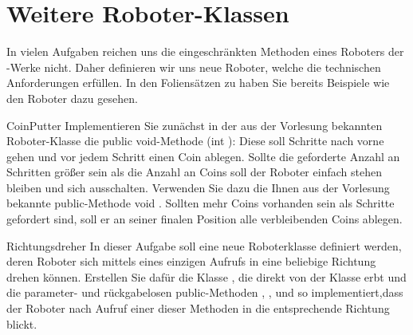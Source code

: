 \documentclass{../preamble}
\begin{document}
\clearpage

\section*{Weitere Roboter-Klassen}
In vielen Aufgaben reichen uns die eingeschränkten Methoden eines Roboters der -Werke nicht. Daher definieren wir uns neue Roboter, welche die technischen Anforderungen erfüllen. In den Foliensätzen zu  haben Sie bereits Beispiele wie den  Roboter dazu gesehen.


\begin{task}[credit = \stars{1}{3}]{CoinPutter}
    Implementieren Sie zunächst in der aus der Vorlesung bekannten Roboter-Klasse  die \textcolor{keywordcolor}{public} \textcolor{keywordcolor}{void}-Methode (\textcolor{keywordcolor}{int} ): Diese soll  Schritte nach vorne gehen und vor jedem Schritt einen Coin ablegen. Sollte die geforderte Anzahl an Schritten größer sein als die Anzahl an Coins soll der Roboter einfach stehen bleiben und sich ausschalten. Verwenden Sie dazu die Ihnen aus der Vorlesung bekannte \textcolor{keywordcolor}{public}-Methode \textcolor{keywordcolor}{void} . Sollten mehr Coins vorhanden sein als Schritte gefordert sind, soll er an seiner finalen Position alle verbleibenden Coins ablegen.

    \begin{solution}
        
    \end{solution}
\end{task}

\clearpage

\begin{task}[credit = \stars{1}{3}]{Richtungsdreher}
    In dieser Aufgabe soll eine neue Roboterklasse definiert werden, deren Roboter sich mittels eines einzigen Aufrufs in eine beliebige Richtung drehen können. Erstellen Sie dafür die Klasse , die direkt von der Klasse  erbt und die parameter- und rückgabelosen \textcolor{keywordcolor}{public}-Methoden , ,  und  so implementiert,dass der Roboter nach Aufruf einer dieser Methoden in die entsprechende Richtung blickt.

    \begin{solution}
        
    \end{solution}
\end{task}
\end{document}
